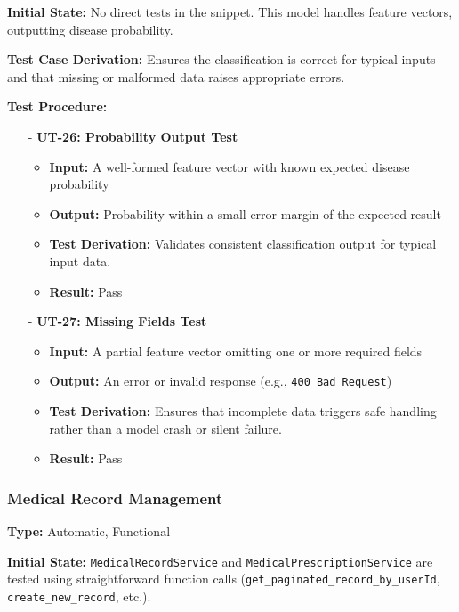 \documentclass[12pt, titlepage]{article}
\begin{document}
\noindent \textbf{Initial State:}
No direct tests in the snippet. This model handles feature vectors, outputting disease probability.
\vspace{10pt}

\noindent \textbf{Test Case Derivation:}
Ensures the classification is correct for typical inputs and that missing or malformed data raises appropriate errors.
\vspace{10pt}

\noindent \textbf{Test Procedure:}
\begin{itemize}
   \item[-] \textbf{UT-26: Probability Output Test} \label{test:prediction-model-prob}
   \begin{itemize}
     \item \textbf{Input:} A well-formed feature vector with known expected disease probability
     \item \textbf{Output:} Probability within a small error margin of the expected result
     \item \textbf{Test Derivation:} Validates consistent classification output for typical input data.
     \item \textbf{Result:} Pass
   \end{itemize}

   \item[-] \textbf{UT-27: Missing Fields Test} \label{test:prediction-model-missing}
   \begin{itemize}
     \item \textbf{Input:} A partial feature vector omitting one or more required fields
     \item \textbf{Output:} An error or invalid response (e.g., \texttt{400 Bad Request})
     \item \textbf{Test Derivation:} Ensures that incomplete data triggers safe handling rather than a model crash or silent failure.
     \item \textbf{Result:} Pass
   \end{itemize}
\end{itemize}
\vspace{10pt}


\subsubsection{Medical Record Management}
\textbf{Type:} Automatic, Functional
\vspace{10pt}

\noindent \textbf{Initial State:}
\texttt{MedicalRecordService} and \texttt{MedicalPrescriptionService} are tested using straightforward function calls (\texttt{get\_paginated\_record\_by\_userId}, \texttt{create\_new\_record}, etc.).
\vspace{10pt}
\end{document}
